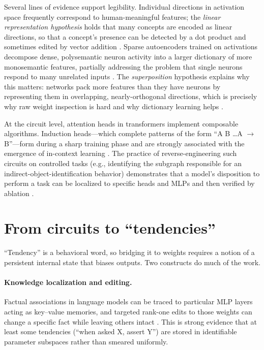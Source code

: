 \documentclass[11pt]{article}
\begin{document}
Several lines of evidence support legibility. Individual directions in activation space frequently correspond to human-meaningful features; the \emph{linear representation hypothesis} holds that many concepts are encoded as linear directions, so that a concept's presence can be detected by a dot product and sometimes edited by vector addition \citep{mikolov2013linguistities,park2023linear}. Sparse autoencoders trained on activations decompose dense, polysemantic neuron activity into a larger dictionary of more monosemantic features, partially addressing the problem that single neurons respond to many unrelated inputs \citep{bricken2023monosemanticity,cunningham2023sparse}. The \emph{superposition} hypothesis explains why this matters: networks pack more features than they have neurons by representing them in overlapping, nearly-orthogonal directions, which is precisely why raw weight inspection is hard and why dictionary learning helps \citep{elhage2022superposition}.

At the circuit level, attention heads in transformers implement composable algorithms. Induction heads---which complete patterns of the form ``A B \dots A $\rightarrow$ B''---form during a sharp training phase and are strongly associated with the emergence of in-context learning \citep{olsson2022incontext,elhage2021mathematical}. The practice of reverse-engineering such circuits on controlled tasks (e.g., identifying the subgraph responsible for an indirect-object-identification behavior) demonstrates that a model's disposition to perform a task can be localized to specific heads and MLPs and then verified by ablation \citep{wang2022interpretability}.

\section{From circuits to ``tendencies''}
``Tendency'' is a behavioral word, so bridging it to weights requires a notion of a persistent internal state that biases outputs. Two constructs do much of the work.

\paragraph{Knowledge localization and editing.} Factual associations in language models can be traced to particular MLP layers acting as key--value memories, and targeted rank-one edits to those weights can change a specific fact while leaving others intact \citep{meng2022locating,geva2021keyvalue}. This is strong evidence that at least some tendencies (``when asked X, assert Y'') are stored in identifiable parameter subspaces rather than smeared uniformly.
\end{document}
